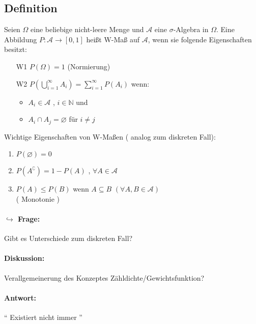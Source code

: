 \documentclass[12pt,a4paper]{article}
\begin{document}
	\subsection{Definition }
	Seien $\Omega$ eine beliebige nicht-leere Menge und $\mathcal{A}$ eine $\sigma$-Algebra in $\Omega$. Eine Abbildung $P:\mathcal{A}\rightarrow[0,1]$ heißt W-Maß auf $\mathcal{A}$, wenn sie folgende Eigenschaften besitzt:
	\begin{itemize}
		\item[W1] $P(\Omega) = 1$ \quad (Normierung)
		\item[W2] $\displaystyle P\left(\bigcup_{i=1}^{\infty} A_i\right) = \sum_{i=1}^{\infty} P(A_i)$ wenn: 
		\begin{itemize}
			\item $A_i\in\mathcal{A}$ , $i\in\mathbb{N}$ und
			\item $A_i\cap A_j =\varnothing$ für $i\neq j$
		\end{itemize}
	\end{itemize}
	Wichtige Eigenschaften von W-Maßen ( analog zum diskreten Fall):
	\begin{enumerate}[i]
		\item $P(\varnothing)=0$
		\item $P(A^\complement )= 1-P(A)$ , $\forall A\in \mathcal{A}$
		\item $P(A)\leq P(B)$ wenn $A\subseteq B$ \quad $(\forall A,B\in\mathcal{A})$\\
		( Monotonie )
	\end{enumerate}
	\paragraph{$\hookrightarrow$ Frage:}
	Gibt es Unterschiede zum diskreten Fall?
	\paragraph{Diskussion:}
	Verallgemeinerung des Konzeptes Zähldichte/Gewichtsfunktion?
	\paragraph{Antwort:}
	`` Existiert nicht immer ''
	
\end{document}
